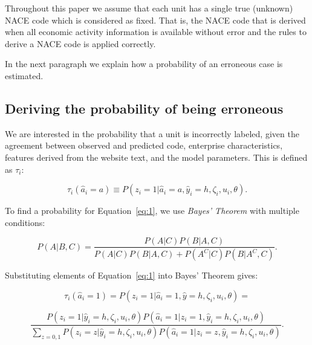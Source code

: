 \documentclass[12pt, a4paper, titlepage]{article}
\begin{document}
Throughout this paper we assume that each unit has a single true (unknown) NACE code which is considered as fixed. That is, the NACE code that is derived when all economic activity information is available without error and the rules to derive a NACE code is applied correctly.

In the next paragraph we explain how a probability of an erroneous case is estimated.

					\subsection{Deriving the probability of being erroneous}
					\label{section:probs}

We are interested in the probability that a unit is incorrectly labeled, given the agreement between observed and predicted code, enterprise characteristics, features derived from the website text, and the model parameters. This is defined as $\tau_i$:

						\begin{equation} \label{eq:1}
\tau_i(\hat{a}_i = a) \equiv P(z_i = 1 | \hat{a}_i = a, \hat{y}_i = h, \zeta_i, u_i, \theta).
						\end{equation}

To find a probability for Equation~\ref{eq:1}, we use \textit{Bayes' Theorem} with multiple conditions:

						\begin{equation*} \label{eq:bayes}
P(A | B, C) =  \frac{P(A | C) P(B | A, C)}{P(A|C)P(B|A,C) + P(A^C|C)P(B|A^C, C)}   .
						\end{equation*}

Substituting elements of Equation~\ref{eq:1} into Bayes' Theorem gives: 

						\begin{equation}\label{eq:2}
\tau_i(\hat{a}_i = 1) = P(z_i = 1 | \hat{a}_i = 1, \hat{y} = h, \zeta_i, u_i, \theta) = 
						\end{equation}

						\begin{equation}\label{eq:3}
\frac{P(z_i = 1|\hat{y}_i = h, \zeta_i, u_i, \theta)P(\hat{a}_i=1|z_i=1, \hat{y}_i = h, \zeta_i, u_i, \theta) }
{\sum_{z=0,1}P(z_i=z|\hat{y}_i = h, \zeta_i, u_i, \theta) P( \hat{a}_i=1|z_i=z, \hat{y}_i = h, \zeta_i, u_i, \theta  )} .
						\end{equation}
\end{document}

